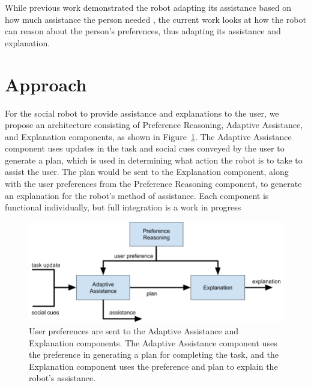 \documentclass[letterpaper]{article}
\begin{document}
While previous work demonstrated the robot adapting its assistance based on how much assistance the person needed \cite{wilson2020challenges}, the current work looks at how the robot can reason about the person's preferences, thus adapting its assistance and explanation.

















\section{Approach}


For the social robot to provide assistance and explanations to the user, we propose an
architecture consisting of Preference Reasoning, Adaptive Assistance, and Explanation
components, as shown in Figure~\ref{fig:arch}.  The Adaptive Assistance component uses updates in the task and social cues conveyed by the user to generate a plan, which is used in determining what action the robot is to take to assist the user.  The plan would be sent to the Explanation component, along with the user preferences from the Preference Reasoning component, to generate an explanation for the robot's method of assistance. Each component is functional individually, but full integration is a work in progress

\begin{figure}[h]
\centering
\includegraphics[width=1.0\columnwidth]{architecture.png}
\caption{User preferences are sent to the Adaptive Assistance and Explanation components.  The Adaptive Assistance component uses the preference in generating a plan for completing the task, and the Explanation component uses the preference and plan to explain the robot's assistance.}
\label{fig:arch}
\end{figure}
\end{document}
